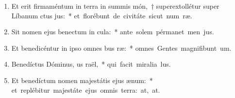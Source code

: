 \begin{flushleft}
\begin{enumerate}[leftmargin=*]
\item Et erit firmaméntum in terra in summis món,~† superextollétur super Líbanum ctus jus:~* \mbox{et florébunt de civitáte sicut num ræ.}
\item Sit nomen ejus benectum in cula:~* \mbox{ante solem pérmanet men jus.}
\item Et benedicéntur in ipso omnes bus ræ:~* \mbox{omnes Gentes magnifibunt um.}
\item Benedíctus Dóminus, us raël,~* \mbox{qui facit miralia lus.}
\item Et benedíctum nomen majestátis ejus  ænum:~* \mbox{et replébitur majestáte ejus omnis terra: at, at.}

\end{enumerate}
\end{flushleft}

